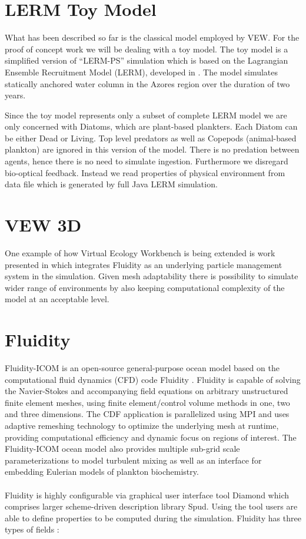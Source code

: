 \documentclass[12pt, a4paper]{report}
\begin{document}
\section{LERM Toy Model}\label{subsec:lermtm}
What has been described so far is the classical model employed by VEW. For the proof of concept work
we will be dealing with a toy model. The toy model is a simplified version of ``LERM-PS'' simulation which
is based on the Lagrangian Ensemble Recruitment Model (LERM), developed in \cite{FisheriesRecruitment}.
The model simulates statically anchored water column in the Azores region over the duration of two years.

Since the toy model represents only a subset of complete LERM model we are only concerned with Diatoms, which
are plant-based plankters. Each Diatom can be either Dead or Living. Top level predators as well as Copepods (animal-based plankton)
are ignored in this version of the model. There is no predation between agents, hence there is no need to simulate
ingestion. Furthermore we disregard bio-optical feedback. Instead we read properties of physical environment
from data file which is generated by full Java LERM simulation.

\section{VEW 3D}\label{subsec:vew3d}
One example of how Virtual Ecology Workbench is being extended is work presented in \cite{FluidityVEW}
which integrates Fluidity as an underlying particle management system in the simulation. Given
mesh adaptability there is possibility to simulate wider range of environments by also keeping computational
complexity of the model at an acceptable level.

\section{Fluidity}\label{sec:fluidity}
Fluidity-ICOM is an open-source general-purpose ocean model based on
the computational fluid dynamics (CFD) code Fluidity \cite{Piggot2008,fluidity}. Fluidity is
capable of solving the Navier-Stokes and accompanying field equations on
arbitrary unstructured finite element meshes, using finite element/control
volume methods in one, two and three dimensions. The CDF application is
parallelized using MPI and uses adaptive remeshing technology to optimize
the underlying mesh at runtime, providing computational efficiency and
dynamic focus on regions of interest. The Fluidity-ICOM ocean model
also provides multiple sub-grid scale parameterizations to model turbulent
mixing as well as an interface for embedding Eulerian models of plankton
biochemistry.
\\\\
Fluidity is highly configurable via graphical user interface tool Diamond
which comprises larger scheme-driven description library Spud\cite{ham2009spud}. Using the tool
users are able to define properties to be computed during the simulation.
Fluidity has three types of fields \cite{fluidity}:
\end{document}
